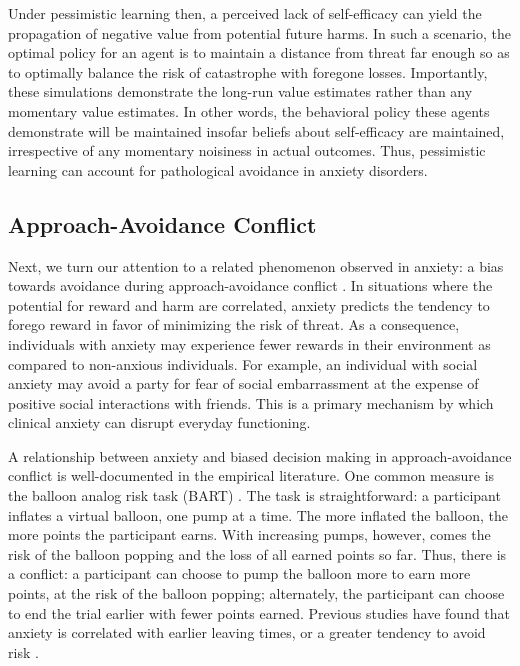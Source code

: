 \documentclass[11pt]{article} %
\begin{document}
Under pessimistic learning then, a perceived lack of self-efficacy can yield the propagation of negative value from potential future harms. In such a scenario, the optimal policy for an agent is to maintain a distance from threat far enough so as to optimally balance the risk of catastrophe with foregone losses. Importantly, these simulations demonstrate the long-run value estimates rather than any momentary value estimates. In other words, the behavioral policy these agents demonstrate will be maintained insofar beliefs about self-efficacy are maintained, irrespective of any momentary noisiness in actual outcomes. Thus, pessimistic learning can account for pathological avoidance in anxiety disorders.

\subsection{Approach-Avoidance Conflict}

Next, we turn our attention to a related phenomenon observed in anxiety: a bias towards avoidance during approach-avoidance conflict \citep{aupperle2010}. In situations where the potential for reward and harm are correlated,
anxiety predicts the tendency to forego reward in favor of minimizing the risk of threat. As a consequence, individuals with anxiety may experience fewer rewards in their environment as compared to non-anxious individuals. For example, an individual with social anxiety may avoid a party for fear of social embarrassment at the expense of positive social interactions with friends. This is a primary mechanism by which clinical anxiety can disrupt everyday functioning.

A relationship between anxiety and biased decision making in approach-avoidance conflict is well-documented in the empirical literature. One common measure is the balloon analog risk task (BART) \citep{Lejuez2002}. The task is straightforward: a participant inflates a virtual balloon, one pump at a time. The more inflated the balloon, the more points the participant earns. With increasing pumps, however, comes the risk of the balloon popping and the loss of all earned points so far. Thus, there is a conflict: a participant can choose to pump the balloon more to earn more points, at the risk of the balloon popping; alternately, the participant can choose to end the trial earlier with fewer points earned. Previous studies have found that anxiety is correlated with earlier leaving times, or a greater tendency to avoid risk \cite{Maner2007, Giorgetta2012}.
\end{document}
